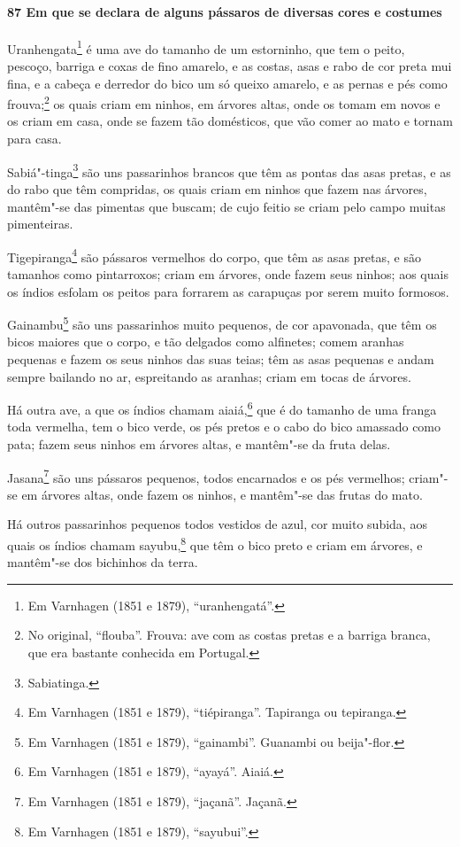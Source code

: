 \paragraph{87 Em que se declara de alguns pássaros de diversas cores e costumes}

Uranhengata\footnote{ Em Varnhagen (1851 e 1879), ``uranhengatá''.} é uma ave do tamanho
de um estorninho, que tem o peito, pescoço, barriga e coxas de fino amarelo, e as costas,
asas e rabo de cor preta mui fina, e a cabeça e derredor do bico um só queixo amarelo, e
as pernas e pés como frouva;\footnote{ No original, ``flouba''. Frouva: ave com as costas
pretas e a barriga branca, que era bastante conhecida em Portugal.} os quais criam em
ninhos, em árvores altas, onde os tomam em novos e os criam em casa, onde se fazem tão
domésticos, que vão comer ao mato e tornam para casa.

Sabiá"-tinga\footnote{ Sabiatinga.} são uns passarinhos brancos que têm as pontas das asas
pretas, e as do rabo que têm compridas, os quais criam em ninhos que fazem nas árvores,
mantêm"-se das pimentas que buscam; de cujo feitio se criam pelo campo muitas pimenteiras.

Tigepiranga\footnote{ Em Varnhagen (1851 e 1879), ``tiépiranga''. Tapiranga ou tepiranga.}
são pássaros vermelhos do corpo, que têm as asas pretas, e são tamanhos como pintarroxos;
criam em árvores, onde fazem seus ninhos; aos quais os índios esfolam os peitos para
forrarem as carapuças por serem muito formosos.

Gainambu\footnote{ Em Varnhagen (1851 e 1879), ``gainambi''. Guanambi ou beija"-flor.} são
uns passarinhos muito pequenos, de cor apavonada, que têm os bicos maiores que o corpo, e
tão delgados como alfinetes; comem aranhas pequenas e fazem os seus ninhos das suas teias;
têm as asas pequenas e andam sempre bailando no ar, espreitando as aranhas; criam em tocas
de árvores.

Há outra ave, a que os índios chamam aiaiá,\footnote{ Em Varnhagen (1851 e 1879),
``ayayá''. Aiaiá.} que é do tamanho de uma franga toda vermelha, tem o bico verde, os pés
pretos e o cabo do bico amassado como pata; fazem seus ninhos em árvores altas, e 
mantêm"-se da fruta delas.

Jasana\footnote{ Em Varnhagen (1851 e 1879), ``jaçanã''. Jaçanã.} são uns pássaros
pequenos, todos encarnados e os pés vermelhos; criam"-se em árvores altas, onde fazem os
ninhos, e mantêm"-se das frutas do mato.

Há outros passarinhos pequenos todos vestidos de azul, cor muito subida, aos quais os
índios chamam sayubu,\footnote{ Em Varnhagen (1851 e 1879), ``sayubui''.} que têm o bico
preto e criam em árvores, e mantêm"-se dos bichinhos da terra.

